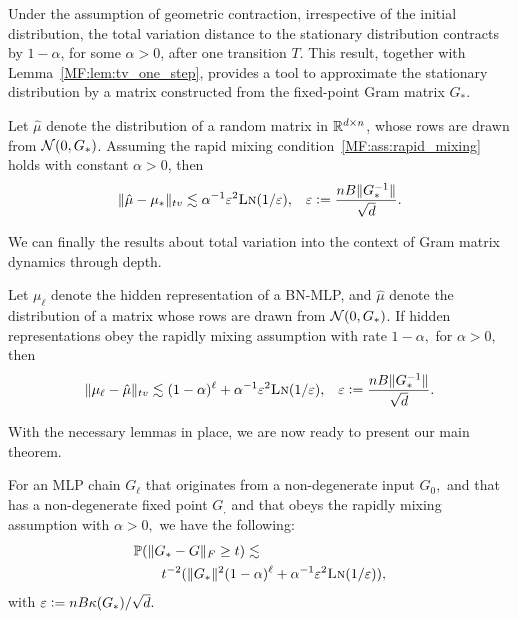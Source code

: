 Under the assumption of geometric contraction, irrespective of the initial distribution, the total variation distance to the stationary distribution contracts by $1-\alpha$, for some $\alpha>0$, after one transition $T$. This result, together with Lemma~\ref{MF:lem:tv_one_step}, provides a tool to approximate the stationary distribution by a matrix constructed from the fixed-point Gram matrix $G_*$.

\begin{lemma}\label{MF:lem:stationary_dist_approximation}
    Let $\hat\mu$ denote the distribution of a random matrix in $\mathbb{R}^{d\times n}$, whose rows are drawn \iid from $\mathcal{N}(0,G_*)$. Assuming the rapid mixing condition~\ref{MF:ass:rapid_mixing} holds with constant $\alpha> 0$, then
    \begin{align}
        \lVert\hat\mu-\mu_*\rVert_{tv}\lesssim \alpha^{-1}{\varepsilon}^2\text{\sc{Ln}}(1/{\varepsilon}), && {\varepsilon}:=\frac{n{B} \lVert G^{-1}_*\rVert}{\sqrt{d}}.
    \end{align}
\end{lemma}

We can finally the results about total variation into the context of Gram matrix dynamics through depth.
\begin{lemma}\label{MF:lem:multiple_steps_total_variation}
    Let $\mu_\ell$ denote the hidden representation of a BN-MLP, and $\hat\mu$ denote the distribution of a matrix whose rows are drawn from $\mathcal{N}(0,G_*)$. If hidden representations obey the rapidly mixing assumption with rate $1-\alpha,$ for $\alpha>0,$ then 
    \begin{align}
        \lVert\mu_\ell-\hat\mu\rVert_{tv}\lesssim (1-\alpha)^\ell + \alpha^{-1}{\varepsilon}^2\text{\sc{Ln}}(1/{\varepsilon}), && {\varepsilon}:=\frac{n{B}\lVert G_*^{-1}\rVert}{\sqrt{d}}.
    \end{align}
\end{lemma}





With the necessary lemmas in place, we are now ready to present our main theorem.

\begin{theorem}\label{MF:thm:concentration_restated}
For an MLP chain $G_\ell$ that originates from a non-degenerate input $G_0,$ and that has a non-degenerate fixed point $G_,$ and that obeys the rapidly mixing assumption with $\alpha>0,$ we have the following:
\begin{align}
    &\mathbb{P}(\|G_* - G \|_F \ge t)\lesssim \nonumber\\
    &\qquad t^{-2}(\|G_*\|^2 (1-\alpha)^\ell + \alpha^{-1} {\varepsilon}^2 \text{\sc{Ln}}(1/{\varepsilon})),
\end{align}
with ${\varepsilon}:= n B \kappa(G_*)/\sqrt{d}.$ 
\end{theorem}

